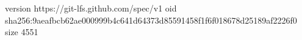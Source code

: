 version https://git-lfs.github.com/spec/v1
oid sha256:9aeafbcb62ae000999b4c641d64373d85591458f1f6f018678d25189af2226f0
size 4551
